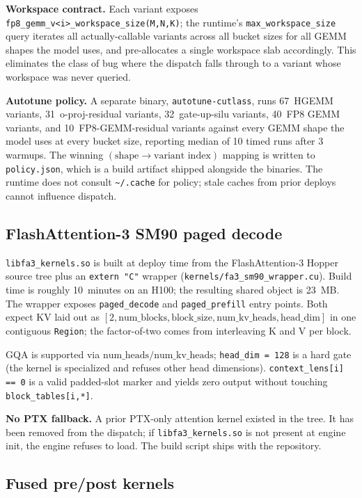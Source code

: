 \textbf{Workspace contract.} Each variant exposes
\texttt{fp8\_gemm\_v<i>\_workspace\_size(M,N,K)}; the runtime's
\texttt{max\_workspace\_size} query iterates all actually-callable
variants across all bucket sizes for all GEMM shapes the model uses,
and pre-allocates a single workspace slab accordingly. This eliminates
the class of bug where the dispatch falls through to a variant whose
workspace was never queried.

\textbf{Autotune policy.} A separate binary, \texttt{autotune-cutlass},
runs 67~HGEMM variants, 31~o-proj-residual variants, 32~gate-up-silu
variants, 40~FP8 GEMM variants, and 10~FP8-GEMM-residual variants
against every GEMM shape the model uses at every bucket size, reporting
median of 10 timed runs after 3 warmups. The winning
$(\text{shape} \to \text{variant index})$ mapping is written to
\texttt{policy.json}, which is a build artifact shipped alongside the
binaries. The runtime does not consult \texttt{\textasciitilde/.cache}
for policy; stale caches from prior deploys cannot influence dispatch.

\subsection{FlashAttention-3 SM90 paged decode}

\texttt{libfa3\_kernels.so} is built at deploy time from the
FlashAttention-3 Hopper source tree plus an
\texttt{extern "C"} wrapper (\texttt{kernels/fa3\_sm90\_wrapper.cu}).
Build time is roughly 10~minutes on an H100; the resulting shared object
is 23~MB. The wrapper exposes \texttt{paged\_decode} and
\texttt{paged\_prefill} entry points. Both expect KV laid out as
$[2, \text{num\_blocks}, \text{block\_size}, \text{num\_kv\_heads},
\text{head\_dim}]$ in one contiguous \texttt{Region}; the factor-of-two
comes from interleaving K and V per block.

GQA is supported via $\text{num\_heads} / \text{num\_kv\_heads}$;
\texttt{head\_dim = 128} is a hard gate (the kernel is specialized and
refuses other head dimensions). \texttt{context\_lens[i] == 0} is a
valid padded-slot marker and yields zero output without touching
\texttt{block\_tables[i,*]}.

\textbf{No PTX fallback.} A prior PTX-only attention kernel existed
in the tree. It has been removed from the dispatch; if
\texttt{libfa3\_kernels.so} is not present at engine init, the engine
refuses to load. The build script ships with the repository.

\subsection{Fused pre/post kernels}

